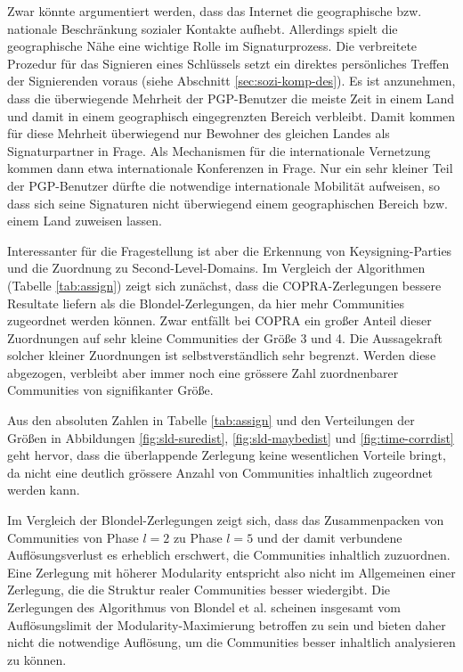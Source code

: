 Zwar könnte argumentiert werden, dass das Internet die geographische
bzw. nationale Beschränkung sozialer Kontakte aufhebt. Allerdings
spielt die geographische Nähe eine wichtige Rolle im
Signaturprozess. Die verbreitete Prozedur für das Signieren eines
Schlüssels setzt ein direktes persönliches Treffen der
Signierenden voraus (siehe Abschnitt \ref{sec:sozi-komp-des}). Es ist
anzunehmen, dass die überwiegende Mehrheit der PGP-Benutzer die
meiste Zeit in einem Land und damit in einem geographisch
eingegrenzten Bereich verbleibt. Damit kommen für diese Mehrheit
überwiegend nur Bewohner des gleichen Landes als Signaturpartner in
Frage. Als Mechanismen für die internationale Vernetzung kommen dann
etwa internationale Konferenzen in Frage. Nur ein sehr kleiner Teil
der PGP-Benutzer dürfte die notwendige internationale Mobilität
aufweisen, so dass sich seine Signaturen nicht überwiegend einem
geographischen Bereich bzw. einem Land zuweisen lassen.

Interessanter für die Fragestellung ist aber die Erkennung von
Keysigning-Parties und die Zuordnung zu Second-Level-Domains. Im
Vergleich der Algorithmen (Tabelle \ref{tab:assign}) zeigt sich
zunächst, dass die COPRA-Zerlegungen bessere Resultate liefern als
die Blondel-Zerlegungen, da hier mehr Communities zugeordnet werden
können. Zwar entfällt bei COPRA ein großer Anteil dieser
Zuordnungen auf sehr kleine Communities der Größe 3 und 4. Die
Aussagekraft solcher kleiner Zuordnungen ist selbstverständlich sehr
begrenzt. Werden diese abgezogen, verbleibt aber immer noch eine
grössere Zahl zuordnenbarer Communities von signifikanter Größe. 

Aus den absoluten Zahlen in Tabelle \ref{tab:assign} und den
Verteilungen der Größen in Abbildungen \ref{fig:sld-suredist},
\ref{fig:sld-maybedist} und \ref{fig:time-corrdist} geht hervor, dass
die \"uberlappende Zerlegung keine wesentlichen Vorteile bringt, da
nicht eine deutlich gr\"ossere Anzahl von Communities inhaltlich
zugeordnet werden kann. 

Im Vergleich der Blondel-Zerlegungen zeigt sich, dass das
Zusammenpacken von Communities von Phase $l=2$ zu Phase $l=5$ und der
damit verbundene Auflösungsverlust es erheblich erschwert, die
Communities inhaltlich zuzuordnen. Eine Zerlegung mit höherer
Modularity entspricht also nicht im Allgemeinen einer Zerlegung, die
die Struktur realer Communities besser wiedergibt. Die Zerlegungen des
Algorithmus von Blondel et al. scheinen insgesamt vom
Auflösungslimit der Modularity-Maximierung betroffen zu sein und
bieten daher nicht die notwendige Auflösung, um die Communities
besser inhaltlich analysieren zu können.

